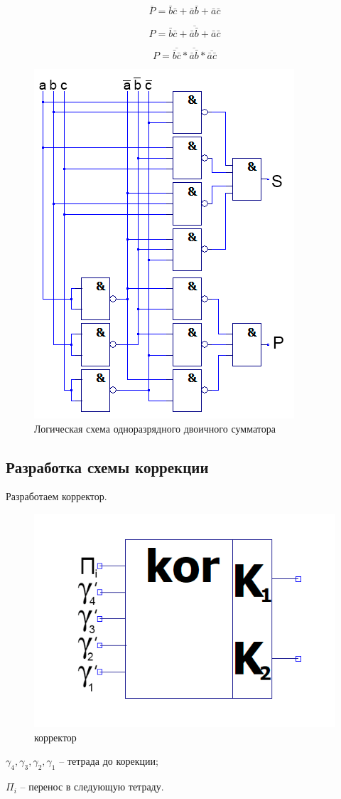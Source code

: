 \documentclass[a4paper,14pt]{article}
\begin{document}
$$\overline{P} = \bar{b}\bar{c} + \bar{a}\bar{b} + \bar{a}\bar{c}$$

$$P = \overline{ \bar{b}\bar{c} + \bar{a}\bar{b} + \bar{a}\bar{c}}$$

$$ P = \overline{ \bar{b}\bar{c}} *  \overline{ \bar{a}\bar{b}} * \overline{ \bar{a}\bar{c}}$$

\begin{figure}[H]
	\centering
	\includegraphics[width=0.5\linewidth]{images/dvSum_sh}
	\caption{Логическая схема одноразрядного двоичного сумматора}
	\label{fig:dvSum_sh}
\end{figure}

\subsection{Разработка схемы коррекции}

Разработаем корректор.

\begin{figure}[H]
	\centering
	\includegraphics[width=0.3\linewidth]{images/korr_el}
	\caption{корректор}
	\label{fig:korr_el}
\end{figure}

$\gamma_4, \gamma_3, \gamma_2, \gamma_1$ -- тетрада до корекции;

$\Pi_i$ -- перенос в следующую тетраду.
\end{document}
